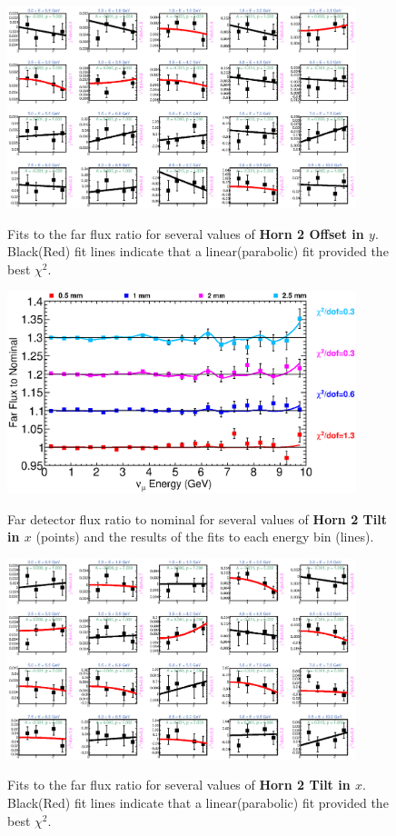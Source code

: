 \begin{figure}[hb]
  \begin{center}
    {\includegraphics[width=4.0in]{figures/Horn2YOffset_far_fits.eps}}
  \end{center}
\caption{ Fits to the far flux ratio for several values of {\bf Horn 2 Offset in $y$}. Black(Red) fit lines indicate that a linear(parabolic) fit provided the best $\chi^2$. }
\end{figure}



\begin{figure}[ht]
  \begin{center}
    {\includegraphics[width=4.0in]{figures/Horn2XTilt_far_summary.eps}}
  \end{center}
\caption{ Far detector flux ratio to nominal for several values of {\bf Horn 2 Tilt in $x$} (points) and the results of the fits to each energy bin (lines).}
\end{figure}

\begin{figure}[hb]
  \begin{center}
    {\includegraphics[width=4.0in]{figures/Horn2XTilt_far_fits.eps}}
  \end{center}
\caption{ Fits to the far flux ratio for several values of {\bf Horn 2 Tilt in $x$}. Black(Red) fit lines indicate that a linear(parabolic) fit provided the best $\chi^2$. }
\end{figure}

